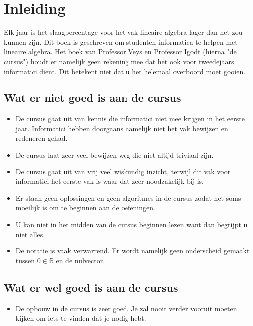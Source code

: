 \documentclass[lineaire_algebra_oplossingen.tex]{subfiles}
\begin{document}
\newpage
\section*{Inleiding}
Elk jaar is het slaagpercentage voor het vak lineaire algebra lager dan het zou kunnen zijn. Dit boek is geschreven om studenten informatica te helpen met lineaire algebra. Het boek van Professor Veys en Professor Igodt (hierna "de cursus") houdt er namelijk geen rekening mee dat het ook voor tweedejaars informatici dient. Dit betekent niet dat u het helemaal overboord moet gooien.

\subsection*{Wat er niet goed is aan de cursus}
\begin{itemize}
\item De cursus gaat uit van kennis die informatici niet mee krijgen in het eerste jaar. Informatici hebben doorgaans namelijk niet het vak bewijzen en redeneren gehad.
\item De cursus laat zeer veel bewijzen weg die niet altijd triviaal zijn.
\item De cursus gaat uit van vrij veel wiskundig inzicht, terwijl dit vak voor informatici het eerste vak is waar dat zeer noodzakelijk bij is.
\item Er staan geen oplossingen en geen algoritmes in de cursus zodat het soms moeilijk is om te beginnen aan de oefeningen.
\item U kan niet in het midden van de cursus beginnen lezen want dan begrijpt u niet alles.
\item De notatie is vaak verwarrend. Er wordt namelijk geen onderscheid gemaakt tussen $0\in \mathbb{R}$ en de nulvector.
\end{itemize}
\subsection*{Wat er wel goed is aan de cursus}
\begin{itemize}
\item De opbouw in de cursus is zeer goed. Je zal nooit verder vooruit moeten kijken om iets te vinden dat je nodig hebt.
\end{itemize}
\end{document}
